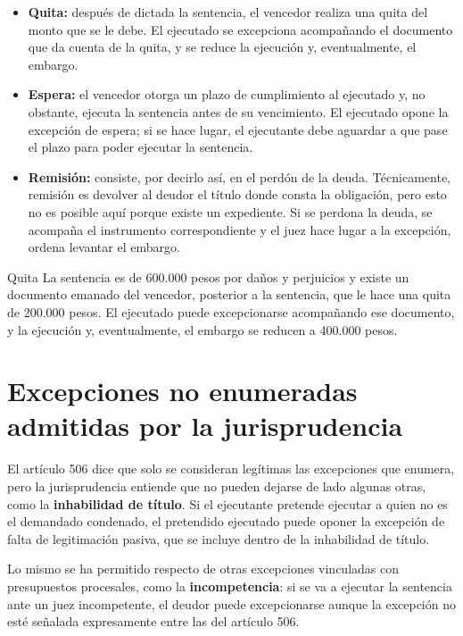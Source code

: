 \documentclass[12pt,oneside]{book}
\begin{document}
\begin{itemize}
    \item \textbf{Quita:} después de dictada la sentencia, el vencedor realiza una quita del monto que se le debe. El ejecutado se excepciona acompañando el documento que da cuenta de la quita, y se reduce la ejecución y, eventualmente, el embargo.
    \item \textbf{Espera:} el vencedor otorga un plazo de cumplimiento al ejecutado y, no obstante, ejecuta la sentencia antes de su vencimiento. El ejecutado opone la excepción de espera; si se hace lugar, el ejecutante debe aguardar a que pase el plazo para poder ejecutar la sentencia.
    \item \textbf{Remisión:} consiste, por decirlo así, en el perdón de la deuda. Técnicamente, remisión es devolver al deudor el título donde consta la obligación, pero esto no es posible aquí porque existe un expediente. Si se perdona la deuda, se acompaña el instrumento correspondiente y el juez hace lugar a la excepción, ordena levantar el embargo.
\end{itemize}

\begin{example}{Quita}
La sentencia es de 600.000 pesos por daños y perjuicios y existe un documento emanado del vencedor, posterior a la sentencia, que le hace una quita de 200.000 pesos. El ejecutado puede excepcionarse acompañando ese documento, y la ejecución y, eventualmente, el embargo se reducen a 400.000 pesos.
\end{example}

\section{Excepciones no enumeradas admitidas por la jurisprudencia}

El artículo 506 dice que solo se consideran legítimas las excepciones que enumera, pero la jurisprudencia entiende que no pueden dejarse de lado algunas otras, como la \textbf{inhabilidad de título}. Si el ejecutante pretende ejecutar a quien no es el demandado condenado, el pretendido ejecutado puede oponer la excepción de falta de legitimación pasiva, que se incluye dentro de la inhabilidad de título.

Lo mismo se ha permitido respecto de otras excepciones vinculadas con presupuestos procesales, como la \textbf{incompetencia}: si se va a ejecutar la sentencia ante un juez incompetente, el deudor puede excepcionarse aunque la excepción no esté señalada expresamente entre las del artículo 506.
\end{document}
